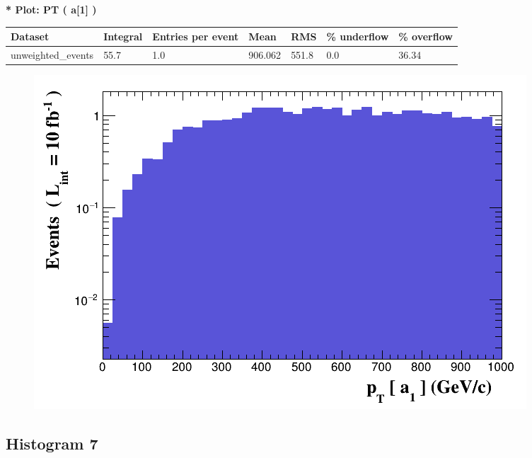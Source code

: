 \documentclass[a4paper, 10pt]{article}
\begin{document}
\textbf{* Plot: PT ( a[1] ) }\\
   \begin{table}[H]
  \begin{center}
    \begin{tabular}{|m{23.0mm}|m{23.0mm}|m{18.0mm}|m{19.0mm}|m{19.0mm}|m{19.0mm}|m{19.0mm}|}
      \hline
      {\cellcolor{yellow}         Dataset}& {\cellcolor{yellow}         Integral}& {\cellcolor{yellow}         Entries per event}& {\cellcolor{yellow}         Mean}& {\cellcolor{yellow}         RMS}& {\cellcolor{yellow}         \% underflow}& {\cellcolor{yellow}         \% overflow}\\
      \hline
      {\cellcolor{white}         unweighted\_events}& {\cellcolor{white}         55.7}& {\cellcolor{white}         1.0}& {\cellcolor{white}         906.062}& {\cellcolor{white}         551.8}& {\cellcolor{red}         0.0}& {\cellcolor{red}         36.34}\\
\hline
    \end{tabular}
  \end{center}
\end{table}

\begin{figure}[H]
  \begin{center}
    \includegraphics[scale=0.45]{selection_5.png}\\
\caption{   }
  \end{center}
\end{figure}
      \newpage
\subsection{ Histogram 7}
\end{document}
